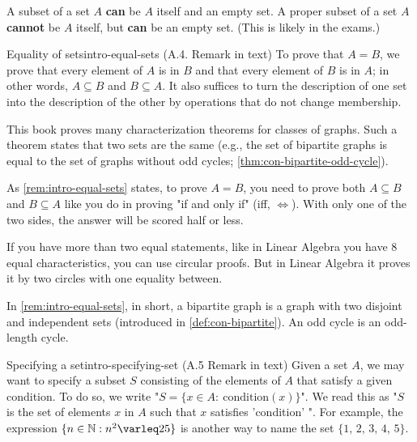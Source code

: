 \documentclass[../src/handouts/main.tex]{subfiles}
\begin{document}
A subset of a set $A$ \textbf{can} be $A$ itself and an empty set. A proper subset of a set $A$ \textbf{cannot} be $A$ itself, but \textbf{can} be an empty set. (This is likely in the exams.)


\begin{remark}{Equality of sets}{intro-equal-sets}
  (A.4. Remark in text)
  To prove that $A = B$, we prove that every element of $A$ is in $B$ and that every element of $B$ is in $A$; in other words, $A \subseteq B$ and $B \subseteq A$. It also suffices to turn the description of one set into the description of the other by operations that do not change membership.

  This book proves many characterization theorems for classes of graphs. Such a theorem states that two sets are the same (e.g., the set of bipartite graphs is equal to the set of graphs without odd cycles; \cref{thm:con-bipartite-odd-cycle}).
\end{remark}

As \cref{rem:intro-equal-sets} states, to prove $A = B$, you need to prove both $A \subseteq B$ and $B \subseteq A$ like you do in proving "if and only if" (iff, $\iff$). With only one of the two sides, the answer will be scored half or less.

If you have more than two equal statements, like in Linear Algebra you have 8 equal characteristics, you can use circular proofs. But in Linear Algebra it proves it by two circles with one equality between.

In \cref{rem:intro-equal-sets}, in short, a bipartite graph is a graph with two disjoint and independent sets (introduced in \cref{def:con-bipartite}). An odd cycle is an odd-length cycle.

\begin{remark}{Specifying a set}{intro-specifying-set}
  (A.5 Remark in text)
  Given a set $A$, we may want to specify a subset $S$ consisting of the elements of $A$ that satisfy a given condition. To do so, we write "$S = \{ x \in A:\ \text{condition}(x)\}$". We read this as "$S$ is the set of elements $x$ in $A$ such that $x$ satisfies 'condition' ". For example, the expression $\{ n \in \N : n^2 \leq 25 \}$ is another way to name the set $\{ 1,\, 2,\, 3,\, 4,\, 5 \}$.
\end{remark}
\end{document}

